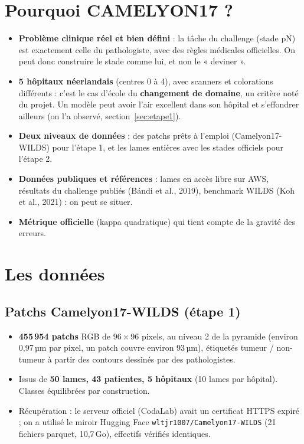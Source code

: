 \documentclass[11pt,a4paper]{article}
\begin{document}
\section{Pourquoi CAMELYON17 ?}
\begin{itemize}
  \item \textbf{Problème clinique réel et bien défini} : la tâche du challenge (stade pN) est exactement celle du pathologiste,
        avec des règles médicales officielles. On peut donc construire le stade comme lui, et non le « deviner ».
  \item \textbf{5 hôpitaux néerlandais} (centres 0 à 4), avec scanners et colorations différents : c'est le cas d'école du
        \textbf{changement de domaine}, un critère noté du projet. Un modèle peut avoir l'air excellent dans son hôpital et
        s'effondrer ailleurs (on l'a observé, section~\ref{sec:etape1}).
  \item \textbf{Deux niveaux de données} : des patchs prêts à l'emploi (Camelyon17-WILDS) pour l'étape 1, et les lames
        entières avec les stades officiels pour l'étape 2.
  \item \textbf{Données publiques et références} : lames en accès libre sur AWS, résultats du challenge publiés
        (Bándi et al., 2019), benchmark WILDS (Koh et al., 2021) : on peut se situer.
  \item \textbf{Métrique officielle} (kappa quadratique) qui tient compte de la gravité des erreurs.
\end{itemize}

\section{Les données}

\subsection{Patchs Camelyon17-WILDS (étape 1)}
\begin{itemize}
  \item \textbf{455\,954 patchs} RGB de $96\times96$ pixels, au niveau 2 de la pyramide (environ 0,97\,µm par pixel,
        un patch couvre environ 93\,µm), étiquetés tumeur / non-tumeur à partir des contours dessinés par des pathologistes.
  \item Issus de \textbf{50 lames, 43 patientes, 5 hôpitaux} (10 lames par hôpital). Classes équilibrées par construction.
  \item Récupération : le serveur officiel (CodaLab) avait un certificat HTTPS expiré ; on a utilisé le miroir Hugging Face
        \texttt{wltjr1007/Camelyon17-WILDS} (21 fichiers parquet, 10,7\,Go), effectifs vérifiés identiques.
\end{itemize}
\end{document}
